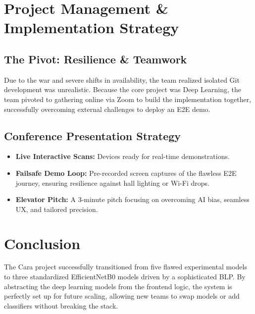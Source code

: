 \documentclass[12pt,a4paper]{article}
\begin{document}
\section{Project Management \& Implementation Strategy}
\subsection{The Pivot: Resilience \& Teamwork}
Due to the war and severe shifts in availability, the team realized isolated Git development was unrealistic. Because the core project was Deep Learning, the team pivoted to gathering online via Zoom to build the implementation together, successfully overcoming external challenges to deploy an E2E demo.

\subsection{Conference Presentation Strategy}
\begin{itemize}
    \item \textbf{Live Interactive Scans:} Devices ready for real-time demonstrations.
    \item \textbf{Failsafe Demo Loop:} Pre-recorded screen captures of the flawless E2E journey, ensuring resilience against hall lighting or Wi-Fi drops.
    \item \textbf{Elevator Pitch:} A 3-minute pitch focusing on overcoming AI bias, seamless UX, and tailored precision.
\end{itemize}

\section{Conclusion}
The Cara project successfully transitioned from five flawed experimental models to three standardized EfficientNetB0 models driven by a sophisticated BLP. By abstracting the deep learning models from the frontend logic, the system is perfectly set up for future scaling, allowing new teams to swap models or add classifiers without breaking the stack.
\end{document}
